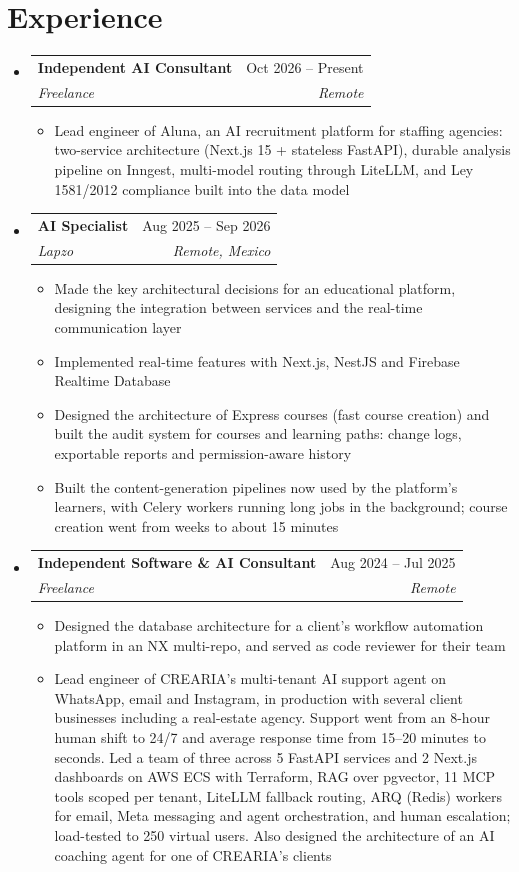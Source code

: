 \documentclass[letterpaper,10pt]{article}
\makeatletter
\newcommand{\resumeSubheading}[4]{
  \vspace{-2pt}
  \item[]
  \begin{tabular*}{\textwidth}{@{\extracolsep{\fill}}l r}
    \textbf{#1} & #2 \\
    \textit{#3} & \textit{#4} \\
  \end{tabular*}
  \vspace{-5pt}
}
\makeatother
\begin{document}
\section{Experience}
\begin{itemize}[leftmargin=0pt, itemindent=0pt, label={}, itemsep=1pt]
\resumeSubheading
{Independent AI Consultant}{Oct 2026 -- Present}
{Freelance}{Remote}
\begin{itemize}[leftmargin=*, itemsep=0pt]
    \item Lead engineer of Aluna, an AI recruitment platform for staffing agencies: two-service architecture (Next.js 15 + stateless FastAPI), durable analysis pipeline on Inngest, multi-model routing through LiteLLM, and Ley 1581/2012 compliance built into the data model
\end{itemize}
\resumeSubheading
{AI Specialist}{Aug 2025 -- Sep 2026}
{Lapzo}{Remote, Mexico}
\begin{itemize}[leftmargin=*, itemsep=0pt]
    \item Made the key architectural decisions for an educational platform, designing the integration between services and the real-time communication layer
    \item Implemented real-time features with Next.js, NestJS and Firebase Realtime Database
    \item Designed the architecture of Express courses (fast course creation) and built the audit system for courses and learning paths: change logs, exportable reports and permission-aware history
    \item Built the content-generation pipelines now used by the platform's learners, with Celery workers running long jobs in the background; course creation went from weeks to about 15 minutes
\end{itemize}
\resumeSubheading
{Independent Software \& AI Consultant}{Aug 2024 -- Jul 2025}
{Freelance}{Remote}
\begin{itemize}[leftmargin=*, itemsep=0pt]
    \item Designed the database architecture for a client's workflow automation platform in an NX multi-repo, and served as code reviewer for their team
    \item Lead engineer of CREARIA's multi-tenant AI support agent on WhatsApp, email and Instagram, in production with several client businesses including a real-estate agency. Support went from an 8-hour human shift to 24/7 and average response time from 15--20 minutes to seconds. Led a team of three across 5 FastAPI services and 2 Next.js dashboards on AWS ECS with Terraform, RAG over pgvector, 11 MCP tools scoped per tenant, LiteLLM fallback routing, ARQ (Redis) workers for email, Meta messaging and agent orchestration, and human escalation; load-tested to 250 virtual users. Also designed the architecture of an AI coaching agent for one of CREARIA's clients

\end{itemize}
\end{itemize}
\end{document}
